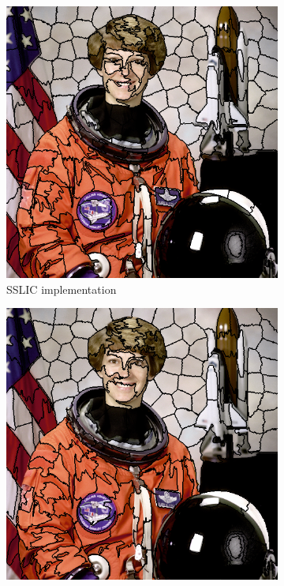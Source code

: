 \documentclass{InsightArticle}
\begin{document}
\begin{figure}
\centering
\begin{subfigure}{0.4\textwidth}
  \includegraphics[width=1.0\textwidth]{images/astronaut_sitk_slic.png}
  \caption{SSLIC implementation}
  \label{fig:a}
\end{subfigure}
\begin{subfigure}{0.4\textwidth}
  \includegraphics[width=1.0\textwidth]{images/astronaut_ski_slic.png}

\end{subfigure}
\end{figure}
\end{document}
